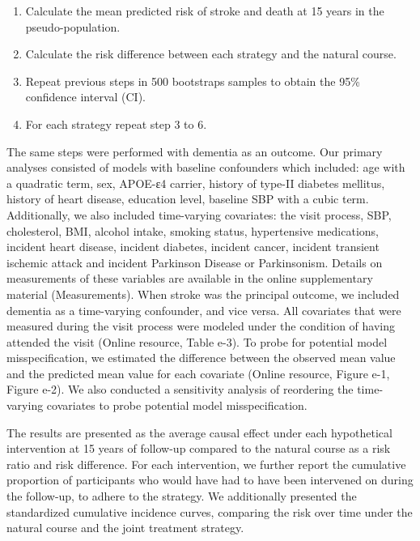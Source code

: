 \documentclass[
]{book}
\begin{document}
\begin{enumerate}
\def\labelenumi{\arabic{enumi}.}
\setcounter{enumi}{3}
\item
  Calculate the mean predicted risk of stroke and death at 15 years in the pseudo-population.
\item
  Calculate the risk difference between each strategy and the natural course.
\item
  Repeat previous steps in 500 bootstraps samples to obtain the 95\% confidence interval (CI).
\item
  For each strategy repeat step 3 to 6.
\end{enumerate}

The same steps were performed with dementia as an outcome. Our primary analyses consisted of models with baseline confounders which included: age with a quadratic term, sex, APOE-ε4 carrier, history of type-II diabetes mellitus, history of heart disease, education level, baseline SBP with a cubic term. Additionally, we also included time-varying covariates: the visit process, SBP, cholesterol, BMI, alcohol intake, smoking status, hypertensive medications, incident heart disease, incident diabetes, incident cancer, incident transient ischemic attack and incident Parkinson Disease or Parkinsonism. Details on measurements of these variables are available in the online supplementary material (Measurements). When stroke was the principal outcome, we included dementia as a time-varying confounder, and vice versa. All covariates that were measured during the visit process were modeled under the condition of having attended the visit (Online resource, Table e-3). To probe for potential model misspecification, we estimated the difference between the observed mean value and the predicted mean value for each covariate (Online resource, Figure e-1, Figure e-2). We also conducted a sensitivity analysis of reordering the time-varying covariates to probe potential model misspecification.

The results are presented as the average causal effect under each hypothetical intervention at 15 years of follow-up compared to the natural course as a risk ratio and risk difference. For each intervention, we further report the cumulative proportion of participants who would have had to have been intervened on during the follow-up, to adhere to the strategy. We additionally presented the standardized cumulative incidence curves, comparing the risk over time under the natural course and the joint treatment strategy.
\end{document}

